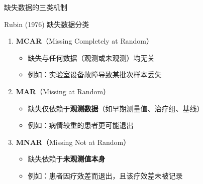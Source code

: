 \documentclass[aspectratio=169,11pt]{beamer}
\begin{document}
\begin{frame}{缺失数据的三类机制}
\begin{block}{Rubin (1976) 缺失数据分类}
\begin{enumerate}
    \item \textbf{MCAR}（Missing Completely at Random）
    \begin{itemize}
        \item 缺失与任何数据（观测或未观测）均无关
        \item 例如：实验室设备故障导致某批次样本丢失
    \end{itemize}
    \item \textbf{MAR}（Missing at Random）
    \begin{itemize}
        \item 缺失仅依赖于\textbf{观测数据}（如早期测量值、治疗组、基线）
        \item 例如：病情较重的患者更可能退出
    \end{itemize}
    \item \textbf{MNAR}（Missing Not at Random）
    \begin{itemize}
        \item 缺失依赖于\textbf{未观测值本身}
        \item 例如：患者因疗效差而退出，且该疗效差未被记录
    \end{itemize}
\end{enumerate}
\end{block}
\end{frame}
\end{document}
